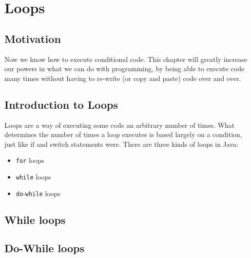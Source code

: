 \section{Loops}

\subsection{Motivation}
Now we know how to execute conditional code. This chapter will greatly increase our powers in what we can do with programming, by being able to execute code many times without having to re-write (or copy and paste) code over and over.

\subsection{Introduction to Loops}
Loops are a way of executing some code an arbitrary number of times. What determines the number of times a loop executes is based largely on a condition, just like if and switch statements were. There are three kinds of loops in Java:
\begin{itemize}
\item \verb|for| loops
\item \verb|while| loops
\item \verb|do|-\verb|while| loops
\end{itemize}

\subsection{While loops}

\subsection{Do-While loops}

